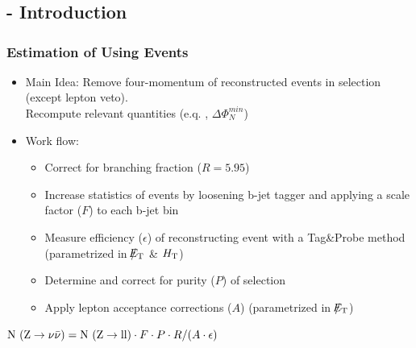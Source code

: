 \documentclass{beamer}
\begin{document}
\section{\ZInvJets}
\begin{frame}
  \begin{center}
    \huge\ZInvJets
    
  \end{center}
\end{frame}


\subsection{\Zll - Introduction}
\begin{frame}
\frametitle{Estimation of \ZInv  Using \Zll Events}
\begin{itemize}
 \item Main Idea: Remove four-momentum of reconstructed \Zll events in selection (except lepton veto).\\ Recompute relevant quantities (e.q. \met, $\Delta\Phi_{N}^{min}$)
 \item Work flow:
 \begin{itemize}
  \item Correct for branching fraction ($R = 5.95$)
  \item Increase statistics of \Zll events by loosening b-jet tagger and applying a scale factor ($F$) to each b-jet bin
  \item Measure efficiency ($\epsilon$) of reconstructing \Zll event with a Tag\&Probe method (parametrized in $\slash\mkern-12mu{E}_{\text{T}}$ \& $H_{\text{T}}$)
  \item Determine and correct for purity ($P$) of \Zll selection
  \item Apply lepton acceptance corrections ($A$) (parametrized in $\slash\mkern-12mu{E}_{\text{T}}$)
 \end{itemize}
\end{itemize}
\begin{block}{}
  \begin{center}
  $\text{N }(\text{Z}\rightarrow\nu\bar{\nu}) = \text{N }(\text{Z}\rightarrow\text{ll})\cdot F \cdot P \cdot R / (A\cdot \epsilon)$
  \end{center}
\end{block}
\end{frame}

\end{document}
